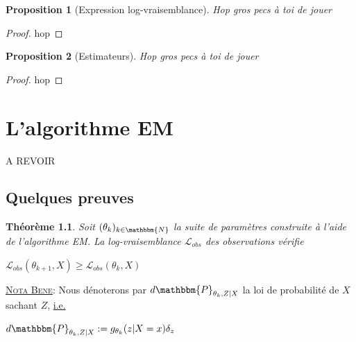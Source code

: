 \documentclass[frenchb]{report}
\newcommand{\N}{\mathbbm{N}}
\newcommand{\1}{\mathbbm{1}}
\newcommand{\prob}{\mathbbm{P}}
\newcommand{\lv}{\mathcal{L}}
\newtheorem{prop}{Proposition}
\newtheorem{thm}{Théorème}
\theoremstyle{definition}\newtheorem{defn}{Définition}
\theoremstyle{definition}\newtheorem{exm}{Exemple}
\theoremstyle{definition}\newtheorem{nota}{Notation}
\theoremstyle{definition}\newtheorem{rem}{Remarque}
\begin{document}
\begin{prop}[Expression log-vraisemblance]
Hop gros pecs à toi de jouer
\end{prop}

\begin{proof}
hop
\end{proof}

\begin{prop}[Estimateurs]
Hop gros pecs à toi de jouer
\end{prop}

\begin{proof}
hop
\end{proof}




\pagebreak

\chapter{L'algorithme EM}

A REVOIR

\section{Quelques preuves}

\begin{thm}
Soit $(\theta_k)_{k\in \N}$ la suite de paramètres construite à l'aide de l'algorithme EM. La log-vraisemblance $\lv_{obs}$ des observations vérifie 
\begin{center} $\lv_{obs}(\theta_{k+1}, X) \geq \lv_{obs}(\theta_k, X)$ \end{center}
\end{thm}

\underline{\textsc{Nota Bene}}:  Nous dénoterons par $d\prob_{\theta_k, Z | X}$ la loi de probabilité de $X$ sachant $Z$, \underline{i.e.} 
\begin{center} $d\prob_{\theta_k, Z | X} := g_{\theta_k}(z|X=x)\delta_z$ \end{center}
\end{document}
